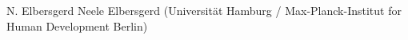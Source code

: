 
                {N. Elbersgerd}
                {Neele Elbersgerd (Universität Hamburg / Max-Planck-Institut for Human Development Berlin)}
                